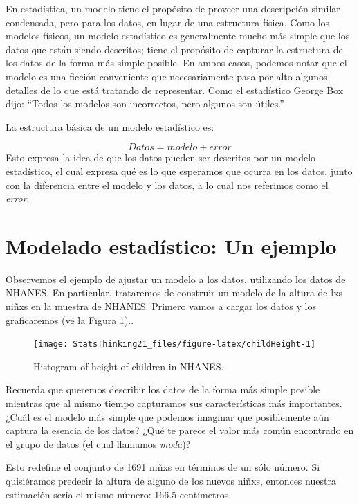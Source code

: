\documentclass[
  12pt,
]{book}
\begin{document}
En estadística, un modelo tiene el propósito de proveer una descripción similar condensada, pero para los datos, en lugar de una estructura física. Como los modelos físicos, un modelo estadístico es generalmente mucho más simple que los datos que están siendo descritos; tiene el propósito de capturar la estructura de los datos de la forma más simple posible. En ambos casos, podemos notar que el modelo es una ficción conveniente que necesariamente pasa por alto algunos detalles de lo que está tratando de representar. Como el estadístico George Box dijo: ``Todos los modelos son incorrectos, pero algunos son útiles.''

La estructura básica de un modelo estadístico es:

\[
Datos= modelo + error
\]
Esto expresa la idea de que los datos pueden ser descritos por un modelo estadístico, el cual expresa qué es lo que esperamos que ocurra en los datos, junto con la diferencia entre el modelo y los datos, a lo cual nos referimos como el \emph{error}.

\hypertarget{modelado-estaduxedstico-un-ejemplo}{%
\section{Modelado estadístico: Un ejemplo}\label{modelado-estaduxedstico-un-ejemplo}}

Observemos el ejemplo de ajustar un modelo a los datos, utilizando los datos de NHANES. En particular, trataremos de construir un modelo de la altura de lxs niñxs en la muestra de NHANES. Primero vamos a cargar los datos y los graficaremos (ve la Figura \ref{fig:childHeight})..

\begin{figure}
\texttt{[image: StatsThinking21\_files/figure-latex/childHeight-1]} \caption{Histogram of height of children in NHANES.}\label{fig:childHeight}
\end{figure}

Recuerda que queremos describir los datos de la forma más simple posible mientras que al mismo tiempo capturamos sus características más importantes. ¿Cuál es el modelo más simple que podemos imaginar que posiblemente aún captura la esencia de los datos? ¿Qué te parece el valor más común encontrado en el grupo de datos (el cual llamamos \emph{moda})?

Esto redefine el conjunto de 1691 niñxs en términos de un sólo número. Si quisiéramos predecir la altura de alguno de los nuevos niñxs, entonces nuestra estimación sería el mismo número: 166.5 centímetros.
\end{document}
